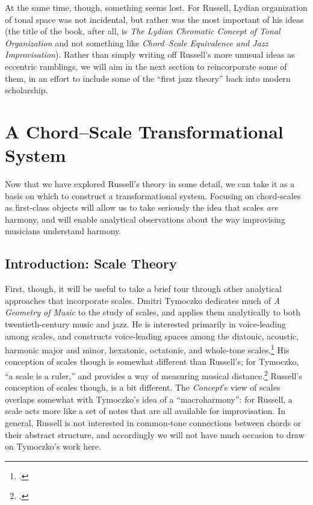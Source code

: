 At the same time, though, something seems lost. For Russell, Lydian
organization of tonal space was not incidental, but rather was the most
important of his ideas (the title of the book, after all, is \emph{The Lydian
Chromatic Concept of Tonal Organization} and not something like
\emph{Chord--Scale Equivalence and Jazz Improvisation}). Rather than simply
writing off Russell's more unusual ideas as eccentric ramblings, we will aim
in the next section to reincorporate some of them, in an effort to include some
of the ``first jazz theory'' back into modern scholarship.

\section{A Chord--Scale Transformational System}
\label{sec:cst}

Now that we have explored Russell's theory in some detail, we can take it as a
basis on which to construct a transformational system. Focusing on
chord-scales as first-class objects will allow us to take seriously the idea
that scales \emph{are} harmony, and will enable analytical observations about
the way improvising musicians understand harmony.

\subsection{Introduction: Scale Theory}
\label{subsec:scale-theory}

First, though, it will be useful to take a brief tour through other analytical
approaches that incorporate scales. Dmitri Tymoczko dedicates much of \emph{A
Geometry of Music} to the study of scales, and applies them analytically to
both twentieth-century music and jazz. He is interested primarily in
voice-leading among scales, and constructs voice-leading spaces among the
diatonic, acoustic, harmonic major and minor, hexatonic, octatonic, and
whole-tone scales.\footcite[135]{tymoczko:2011} His conception of scales
though is somewhat different than Russell's; for Tymoczko, ``a scale is a
ruler,'' and provides a way of measuring musical
distance.\footcite[116]{tymoczko:2011} Russell's conception of scales though,
is a bit different. The \emph{Concept}'s view of scales overlaps somewhat with
Tymoczko's idea of a ``macroharmony'': for Russell, a scale acts more like a
set of notes that are all available for improvisation. In general, Russell is
not interested in common-tone connections between chords or their abstract
structure, and accordingly we will not have much occasion to draw on
Tymoczko's work here.

